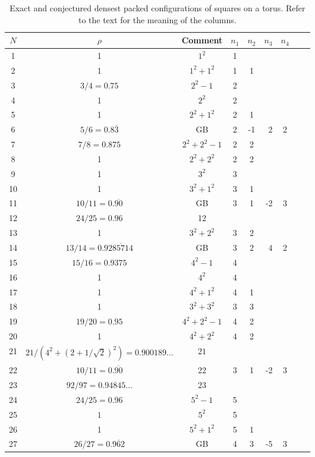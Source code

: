 \documentclass[preprint,aps]{revtex4}
\begin{document}
\vspace{.3in}
\begin{table}
\label{table}
\caption{Exact and conjectured densest packed configurations of squares on a torus.  Refer to the text for the meaning of the columns.}
  \begin{tabular}{|c | c|c | c| c | r | c | c | c |}
\hline
  $N$ &$\rho$&Comment& $n_1$ & $n_2$ & $n_3$ & $n_4$  \\ \hline \hline
   1 &1&  $1^2$ & 1&  &   &    \\ \hline 
   2 &1&  $1^2+1^2$ &1& 1 &  &  \\ \hline
   3 &$3/4=0.75$&  $2^2 -1$ &2&  & &   \\ \hline
   4 &1&  $2^2$ &2& & &   \\ \hline
   5 &1&  $2^2+1^2$ &2& 1 &    & \\ \hline
   6 &$5/6=0.8\bar{3}$& GB &2& -1 &2 & 2   \\ \hline
   7 &$7/8=0.875$& $2^2+2^2 -1$ &2& 2 & &     \\ \hline
   8 &1& $2^2+2^2 $ &2& 2 & &     \\ \hline
   9 &1&  $3^2$ &3& & &  \\ \hline
   10 &1&  $3^2+1^2$ &3& 1 &    & \\ \hline
   11 &$10/11=0.\overline{90}$& GB &3& 1 &-2 & 3   \\ \hline
   12 &$24/25=0.96$& 12 && & &    \\ \hline
   13 &1&  $3^2+2^2$ &3& 2 &    & \\ \hline
   14 &$13/14=0.9\overline{285714}$& GB &3& 2 &4 & 2   \\ \hline
   15 &$15/16=0.9375$&  $4^2 -1$ &4&  & &   \\ \hline
   16 &1&  $4^2$ &4& & &   \\ \hline
   17 &1&  $4^2+1^2$ &4& 1 &    & \\ \hline
   18 &1&  $3^2+3^2$ &3& 3 &    & \\ \hline
   19 &$19/20=0.95$&  $4^2 +2^2 -1$ &4& 2 & &   \\ \hline
   20 &1&  $4^2+2^2$ &4& 2 &    & \\ \hline
   21 &$21/(4^2+(2+1/\sqrt{2})^2)=0.900189 \ldots$&  $21$ & &  &   &    \\ \hline 
   22 &$10/11=0.\overline{90}$& 22 &3& 1 &-2 & 3  \\ \hline
   23 &$92/97=0.94845 \ldots$&  $23$ & &  &   &    \\ \hline
   24 &$24/25=0.96$&  $5^2 -1$ &5&  & &   \\ \hline
   25 &$1$&  $5^2$ &5&  & &   \\ \hline
   26 &1&  $5^2+1^2$ &5& 1 &    & \\ \hline
   27 &$26/27=0.\overline{962}$& GB &4&3 &-5 & 3  \\ \hline

\hline
\end{tabular}
\end{table}
\end{document}
